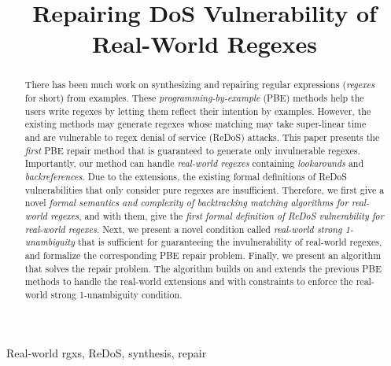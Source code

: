 \documentclass[conference]{IEEEtran}
\begin{document}
\title{Repairing DoS Vulnerability of Real-World Regexes}





\author{
\and
{}
}

\maketitle

\pagestyle{plain}

\begin{abstract}
There has been much work on synthesizing and repairing regular expressions ({\em regexes} for short) from examples.  These {\em programming-by-example} (PBE) methods help the users write regexes by letting them reflect their intention by examples.  However, the existing methods may generate regexes whose matching may take super-linear time and are vulnerable to regex denial of service (ReDoS) attacks.  This paper presents the {\em first} PBE repair method that is guaranteed to generate only invulnerable regexes.  Importantly, our method can handle {\em real-world regexes} containing {\em lookarounds} and {\em backreferences}. 
Due to the extensions, the existing formal definitions of ReDoS vulnerabilities that only consider pure regexes are insufficient.  Therefore, we first give a novel {\em formal semantics and complexity of backtracking matching algorithms for real-world regexes}, and with them, give the {\em first formal definition of ReDoS vulnerability for real-world regexes}.
Next, we present a novel condition called {\em real-world strong 1-unambiguity} that is sufficient for guaranteeing the invulnerability of real-world regexes, and formalize the corresponding PBE repair problem.  
Finally, we present an algorithm that solves the repair problem. The algorithm builds on and extends the previous PBE methods to handle the real-world extensions and with constraints to enforce the real-world strong 1-unambiguity condition. \end{abstract}

\begin{IEEEkeywords}
Real-world {rgxs}, ReDoS, synthesis, repair
\end{IEEEkeywords}
\end{document}
